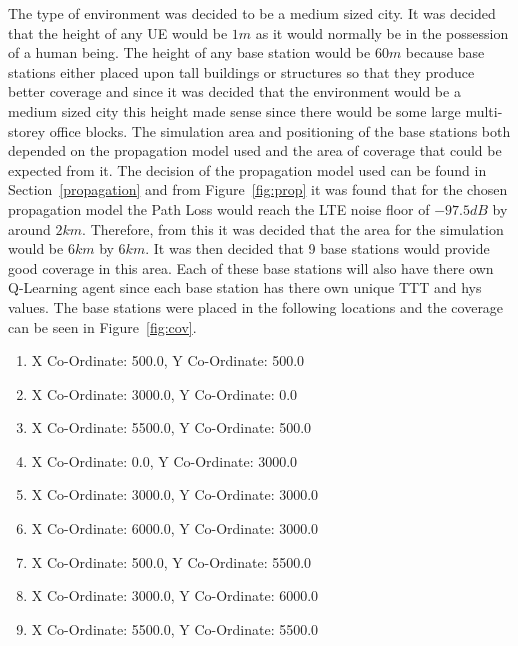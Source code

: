 The type of environment was decided to be a medium sized city. It was decided that the height of any UE would be $1 m$ as it would normally be in the possession of a human being. The height of any base station would be $60 m$ because base stations either placed upon tall buildings or structures so that they produce better coverage and since it was decided that the environment would be a medium sized city this height made sense since there would be some large multi-storey office blocks. The simulation area and positioning of the base stations both depended on the propagation model used and the area of coverage that could be expected from it. The decision of the propagation model used can be found in Section~\ref{propagation} and from Figure~\ref{fig:prop} it was found that for the chosen propagation model the Path Loss would reach the LTE noise floor of $-97.5 dB$ by around $2 km$. Therefore, from this it was decided that the area for the simulation would be $6 km$ by $6 km$. It was then decided that 9 base stations would provide good coverage in this area. Each of these base stations will also have there own Q-Learning agent since each base station has there own unique TTT and hys values. The base stations were placed in the following locations and the coverage can be seen in Figure~\ref{fig:cov}.
\begin{enumerate}
\item X Co-Ordinate: 500.0, Y Co-Ordinate: 500.0
\item X Co-Ordinate: 3000.0, Y Co-Ordinate: 0.0
\item X Co-Ordinate: 5500.0, Y Co-Ordinate: 500.0
\item X Co-Ordinate: 0.0, Y Co-Ordinate: 3000.0
\item X Co-Ordinate: 3000.0, Y Co-Ordinate: 3000.0
\item X Co-Ordinate: 6000.0, Y Co-Ordinate: 3000.0
\item X Co-Ordinate: 500.0, Y Co-Ordinate: 5500.0
\item X Co-Ordinate: 3000.0, Y Co-Ordinate: 6000.0
\item X Co-Ordinate: 5500.0, Y Co-Ordinate: 5500.0
\end{enumerate}
